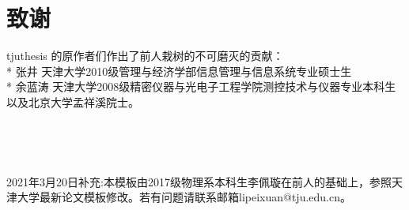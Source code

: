 
\chapter*{致\quad 谢}

tjuthesis 的原作者们作出了前人栽树的不可磨灭的贡献：\\
* 张井 天津大学2010级管理与经济学部信息管理与信息系统专业硕士生\\
* 余蓝涛 天津大学2008级精密仪器与光电子工程学院测控技术与仪器专业本科生\\
以及北京大学孟祥溪院士。

~

~

2021年3月20日补充:本模板由2017级物理系本科生李佩璇在前人的基础上，参照天津大学最新论文模板修改。若有问题请联系邮箱lipeixuan@tju.edu.cn。